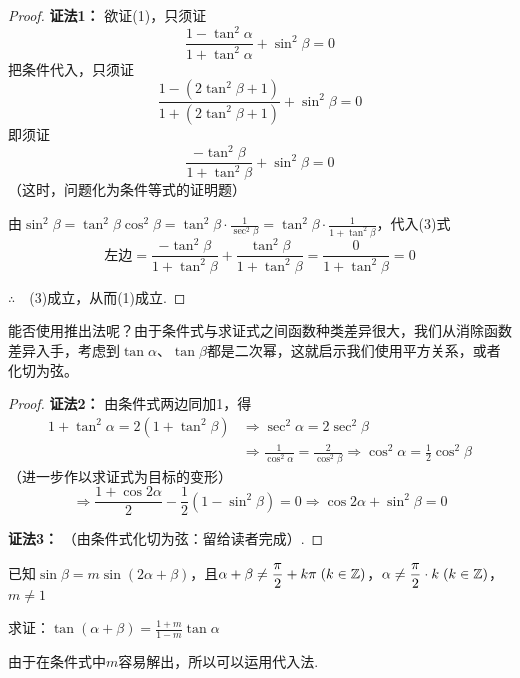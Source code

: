 \begin{proof}
\textbf{证法1：} 欲证(1)，只须证
\begin{equation}
    \frac{1-\tan^2\alpha}{1+\tan^2\alpha}+\sin^2\beta=0\tag{2}
\end{equation}
把条件代入，只须证
\[\frac{1-(2\tan^2\beta+1)}{1+(2\tan^2\beta+1)}+\sin^2\beta=0\]
即须证
\begin{equation}
    \frac{-\tan^2\beta}{1+\tan^2\beta}+\sin^2\beta=0 \tag{3}
\end{equation}
（这时，问题化为条件等式的证明题）

由$\sin^2\beta=\tan^2\beta\cos^2\beta=\tan^2\beta\cdot \frac{1}{\sec^2\beta}=\tan^2\beta\cdot \frac{1}{1+\tan^2\beta}$，代入(3)式
\[\text{左边}=   \frac{-\tan^2\beta}{1+\tan^2\beta}+   \frac{\tan^2\beta}{1+\tan^2\beta}=   \frac{0}{1+\tan^2\beta}=0\]

$\therefore\quad $(3)成立，从而(1)成立.
\end{proof}

\begin{analyze}
能否使用推出法呢？由于条件式与求证式之间函数种类差异很大，我们从消除函数差异入手，考虑到$\tan\alpha$、$\tan\beta$都是二次幂，这就启示我们使用平方关系，或者化切为弦。
\end{analyze}

\begin{proof}
    \textbf{证法2：} 由条件式两边同加1，得
\[\begin{split}
    1+\tan^2\alpha=2(1+\tan^2\beta) &\Rightarrow \sec^2\alpha=2\sec^2\beta \\
    &\Rightarrow \frac{1}{\cos^2\alpha}=\frac{2}{\cos^2\beta}\Rightarrow \cos^2\alpha=\frac{1}{2}\cos^2\beta
\end{split}\]
（进一步作以求证式为目标的变形）
\[\Rightarrow \frac{1+\cos2\alpha}{2}-\frac{1}{2}(1-\sin^2\beta)=0\Rightarrow \cos2\alpha+\sin^2\beta=0\]

    \textbf{证法3：} （由条件式化切为弦：留给读者完成）.
\end{proof}


\begin{example}
已知$\sin\beta=m\sin(2\alpha+\beta)$，且$\alpha+\beta\ne\dfrac{\pi}{2}+k\pi\; (k\in\mathbb{Z})$，$\alpha\ne \dfrac{\pi}{2}\cdot k\; (k\in\mathbb{Z})$，$m\ne 1$

求证：$\tan(\alpha+\beta)=\frac{1+m}{1-m}\tan\alpha$
\end{example}

\begin{analyze}
由于在条件式中$m$容易解出，所以可以运用代入法.
\end{analyze}

